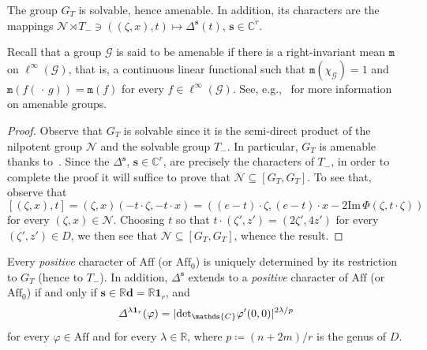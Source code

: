 \documentclass[10.5pt,reqno]{amsart}
\newcommand{\Aff}{\mathrm{Aff}}
\newcommand{\vect}[1]{\mathbf{{#1}}}
\DeclarePairedDelimiter{\abs}{\lvert}{\rvert}
\newcommand{\C}{\mathds{C}}
\newcommand{\R}{\mathds{R}}
\newcommand{\Gc}{\mathcal{G}}
\newcommand{\Nc}{\mathcal{N}}
\renewcommand{\Im}{\mathrm{Im}\,}
\renewcommand{\phi}{\varphi}
\begin{document}
\begin{lem}\label{lem:3}
	The group  $G_T$ is solvable, hence amenable. In addition, its characters are the mappings $\Nc \rtimes T_-\ni ((\zeta,x), t)\mapsto \Delta^{\vect s}(t)$, $\vect s\in \C^r$.
\end{lem}


Recall that a group $\Gc$ is said to be amenable if there is a right-invariant mean $\mathtt{m}$ on $\ell^\infty(\Gc)$, that is, a continuous linear functional such that $\mathtt{m}(\chi_\Gc)=1$ and $\mathtt{m}(f(\,\cdot\,g))=\mathtt{m}(f)$ for every $f\in \ell^\infty(\Gc)$. See, e.g.,~\cite{Pier} for more information on amenable groups.

\begin{proof}
	Observe that $G_T$ is solvable since it is the semi-direct product of the nilpotent group $\Nc$ and the solvable group $T_-$.  In particular, $G_T$ is  amenable thanks to~\cite[Corollary 13.5]{Pier}.  Since the $\Delta^{\vect s}$, $\vect s\in \C^r$, are precisely the characters of $T_-$, in order to complete the proof it will suffice to prove that $\Nc\subseteq[G_T,G_T]$. To see that, observe that
	\[
	[(\zeta,x), t]=(\zeta,x)(-t\cdot\zeta,-t\cdot x)=((e-t)\cdot\zeta,(e-t)\cdot x-2 \Im \Phi(\zeta,t\cdot\zeta))
	\]
	for every $(\zeta,x)\in \Nc$. Choosing $ t$ so that $t\cdot (\zeta',z')=(2\zeta',4z')$ for every $(\zeta',z')\in D$, we then see that $\Nc\subseteq [G_T,G_T]$, whence the result.	
\end{proof}


\begin{lem}\label{lem:6}
	Every \emph{positive} character of $\Aff$ (or $\Aff_0$) is uniquely determined by its restriction to $G_T$ (hence to $T_-$). 
	In addition, $\Delta^{\vect s}$ extends to a \emph{positive} character of $\Aff$ (or $\Aff_0$) if and only if $\vect s\in \R \vect d=\R \vect 1_r$, and
	\[
	\Delta^{\lambda \vect 1_r}(\phi)=\abs{{\det}_\C \phi'(0,0)}^{2\lambda/p}
	\]
	for every $\phi\in \Aff$ and for every $\lambda\in \R$, where $p\coloneqq (n+ 2m)/r$ is the genus of $D$.
\end{lem}
\end{document}
